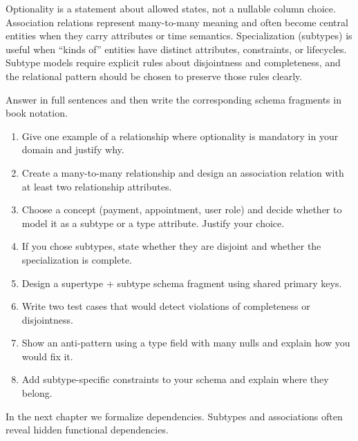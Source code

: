 \begin{chaptersummary}
Optionality is a statement about allowed states, not a nullable column choice.
Association relations represent many-to-many meaning and often become central entities when they carry attributes or time semantics.
Specialization (subtypes) is useful when “kinds of” entities have distinct attributes, constraints, or lifecycles.
Subtype models require explicit rules about disjointness and completeness, and the relational pattern should be chosen to preserve those rules clearly.
\end{chaptersummary}

\begin{exercisebox}
Answer in full sentences and then write the corresponding schema fragments in book notation.
\begin{enumerate}[label=\arabic*.]
  \item Give one example of a relationship where optionality is mandatory in your domain and justify why.
  \item Create a many-to-many relationship and design an association relation with at least two relationship attributes.
  \item Choose a concept (payment, appointment, user role) and decide whether to model it as a subtype or a type attribute. Justify your choice.
  \item If you chose subtypes, state whether they are disjoint and whether the specialization is complete.
  \item Design a supertype + subtype schema fragment using shared primary keys.
  \item Write two test cases that would detect violations of completeness or disjointness.
  \item Show an anti-pattern using a type field with many nulls and explain how you would fix it.
  \item Add subtype-specific constraints to your schema and explain where they belong.
\end{enumerate}
\end{exercisebox}

In the next chapter we formalize dependencies.
Subtypes and associations often reveal hidden functional dependencies.
